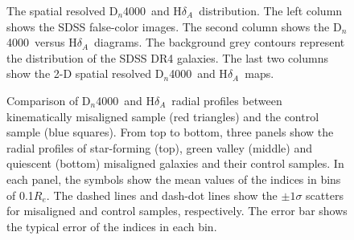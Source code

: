 \documentclass[a4paper,fleqn,usenatbib]{mnras}
\newcommand{\dindex}{D$_n$4000}
\newcommand{\hd}{H$\delta$}
\newcommand{\hda}{\hd$_A$}
\begin{document}
\begin{figure}
  \begin{center}
    
  \end{center}
  \caption{The spatial resolved \dindex\ and \hda\ distribution. The left column shows the SDSS false-color images. The second column shows the \dindex\ versus \hda\ diagrams. The background grey contours represent the distribution of the SDSS DR4 galaxies. The last two columns show the 2-D spatial resolved \dindex\ and \hda\ maps.}
  \label{fig:index}
\end{figure}

\begin{figure}
  \begin{center}
    
  \end{center}
  \caption{Comparison of \dindex\ and \hda\ radial profiles between kinematically misaligned sample (red triangles) and the control sample (blue squares). From top to bottom, three panels show the radial profiles of star-forming (top), green valley (middle) and quiescent (bottom) misaligned galaxies and their control samples. In each panel, the symbols show the mean values of the indices in bins of 0.1$R_e$. The dashed lines and dash-dot lines show the $\pm1\sigma$ scatters for misaligned and control samples, respectively. The error bar shows the typical error of the indices in each bin.}
  \label{fig:radprofile}
\end{figure}

    
\end{document}
